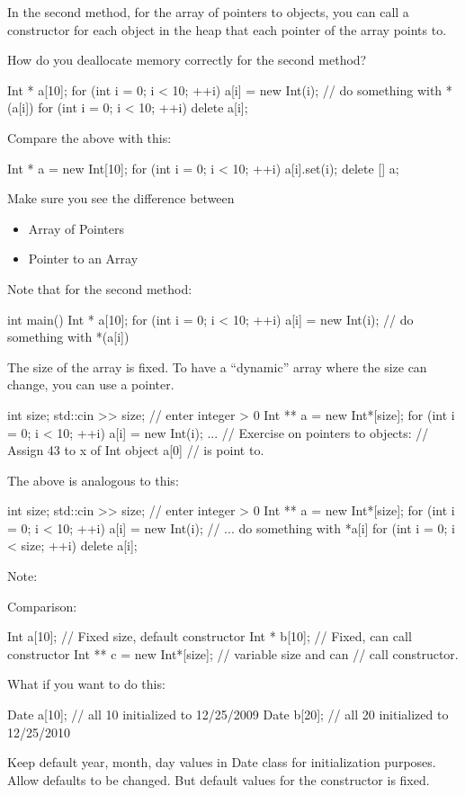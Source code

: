 In the second method, for the array of pointers to objects, you can call
a constructor for each object in the heap that each pointer of the array
points to.

How do you deallocate memory correctly for the second method?

\begin{console}
Int * a[10];
for (int i = 0; i < 10; ++i)
    a[i] = new Int(i);
// do something with *(a[i])
for (int i = 0; i < 10; ++i)
    delete a[i];
\end{console}
Compare the above with this:
\begin{console}
Int * a = new Int[10];
for (int i = 0; i < 10; ++i)
    a[i].set(i);
delete [] a;
\end{console}
Make sure you see the difference between

\begin{itemize}
\item
  Array of Pointers
\item
  Pointer to an Array
\end{itemize}

Note that for the second method:

\begin{console}
int main()
{   
    Int * a[10];
    for (int i = 0; i < 10; ++i)
        a[i] = new Int(i);
    // do something with *(a[i])
}
\end{console}
The size of the array is fixed. To have a ``dynamic'' array where the
size can change, you can use a pointer.
\begin{console}
int size;
std::cin >> size; // enter integer > 0
Int ** a = new Int*[size];
for (int i = 0; i < 10; ++i)
    a[i] = new Int(i);
...
// Exercise on pointers to objects:
// Assign 43 to x of Int object a[0]
// is point to.
\end{console}
The above is analogous to this:
\begin{console}
int size;
std::cin >> size; // enter integer > 0
Int ** a = new Int*[size];
for (int i = 0; i < 10; ++i)
    a[i] = new Int(i);
    // ... do something with *a[i]
for (int i = 0; i < size; ++i)
    delete a[i];
\end{console}
Note:
Comparison:
\begin{console}
Int a[10];        // Fixed size, default constructor
Int * b[10];      // Fixed, can call constructor
Int ** c = new Int*[size]; // variable size and can
                           // call constructor.
\end{console}
What if you want to do this:
\begin{console}
Date a[10]; // all 10 initialized to 12/25/2009
Date b[20]; // all 20 initialized to 12/25/2010
\end{console}
Keep default year, month, day values in Date class for initialization
purposes. Allow defaults to be changed. But default values for the
constructor is fixed.

